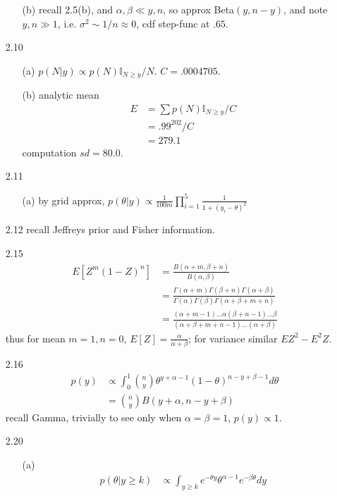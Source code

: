 \documentclass[paper=a4, fontsize=11pt]{scrartcl} %
\numberwithin{equation}{section} %
\numberwithin{figure}{section} %
\numberwithin{table}{section} %
\begin{document}
\begin{itemize}
\begin{itemize}
		\item[(b)] recall 2.5(b), and $\alpha,\beta \ll y,n$, so approx Beta$(y,n-y)$, and note $y,n\gg 1$, i.e. $\sigma^2\sim 1/n\approx 0$, cdf step-func at $.65$.
	\end{itemize}
	\item[2.10]
	\begin{itemize}
		\item[(a)] $p(N|y)\propto p(N)\mathbb{I}_{N\geq y}/N$. $C=.0004705$.
		\item[(b)] analytic mean
		\begin{align}
			E &= \sum p(N)\mathbb{I}_{N\geq y}/C\\
				&= .99^{202}/C\\
				&= 279.1
		\end{align}
		computation $sd=80.0$.
	\end{itemize}
	\item[2.11]
	\begin{itemize}
		\item[(a)] by grid approx, $p(\theta|y)\propto \frac{1}{100m}\prod_{i=1}^5 \frac{1}{1+(y_i-\theta)^2}$
	\end{itemize}
	\item[2.12] recall Jeffreys prior and Fisher information.
	\item[2.15]
	\begin{align}
		E[Z^m(1-Z)^n] &= \frac{B(\alpha+m,\beta+n)}{B(\alpha,\beta)}\\
			&= \frac{\Gamma(\alpha+m)\Gamma(\beta+n)\Gamma(\alpha+\beta)}{\Gamma(\alpha)\Gamma(\beta)\Gamma(\alpha+\beta+m+n)}\\
			&= \frac{(\alpha+m-1)\dots\alpha (\beta+n-1)\dots\beta}{(\alpha+\beta+m+n-1)\dots(\alpha+\beta)}
	\end{align}
	thus for mean $m=1,n=0$, $E[Z]=\frac{\alpha}{\alpha+\beta}$; for variance similar $EZ^2-E^2Z$.
	\item[2.16]
	\begin{align}
		p(y) &\propto \int_0^1{n\choose y} \theta^{y+\alpha-1}(1-\theta)^{n-y+\beta-1}d\theta\\
			&= {n\choose y}B(y+\alpha, n-y+\beta)
	\end{align}
	recall Gamma, trivially to see only when $\alpha=\beta=1$, $p(y)\propto 1$.
	\item[2.20]
	\begin{itemize}
		\item[(a)]
		\begin{align}
			p(\theta|y\geq k) &\propto \int_{y\geq k} e^{-\theta y} \theta^{\alpha-1}e^{-\beta\theta}dy\\

\end{align}
\end{itemize}
\end{itemize}
\end{document}
